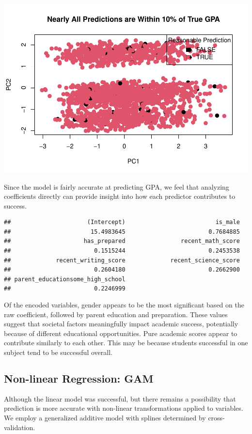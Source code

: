 \documentclass[
]{article}
\begin{document}
\includegraphics{ST494_FP_files/figure-latex/unnamed-chunk-23-1.pdf}

Since the model is fairly accurate at predicting GPA, we feel that
analyzing coefficients directly can provide insight into how each
predictor contributes to success.

\begin{verbatim}
##                      (Intercept)                          is_male 
##                       15.4983645                        0.7684885 
##                     has_prepared                recent_math_score 
##                        0.1515244                        0.2453538 
##             recent_writing_score             recent_science_score 
##                        0.2604180                        0.2662900 
## parent_educationsome_high_school 
##                        0.2246999
\end{verbatim}

Of the encoded variables, gender appears to be the most significant
based on the raw coefficient, followed by parent education and
preparation. These values suggest that societal factors meaningfully
impact academic success, potentially because of different educational
opportunities. Pure academic scores appear to contribute similarly to
each other. This may be because students successful in one subject tend
to be successful overall.

\subsection{Non-linear Regression: GAM}\label{non-linear-regression-gam}

Although the linear model was successful, but there remains a
possibility that prediction is more accurate with non-linear
transformations applied to variables. We employ a generalized additive
model with splines determined by cross-validation.
\end{document}
